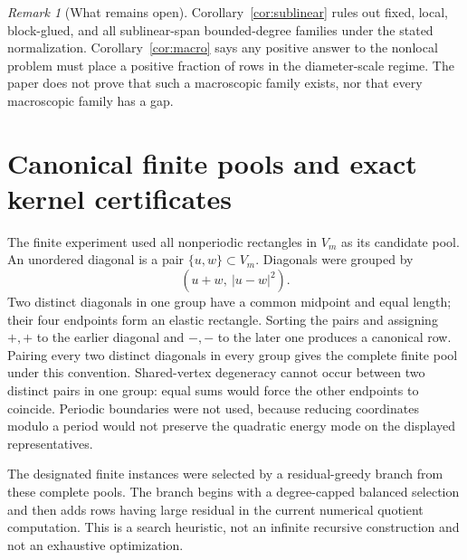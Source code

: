 \documentclass[11pt]{article}
\theoremstyle{definition}
\theoremstyle{remark}
\newtheorem{remark}[theorem]{Remark}
\begin{document}
\begin{remark}[What remains open]\label{rem:nonlocal}
Corollary~\ref{cor:sublinear} rules out fixed, local, block-glued, and all
sublinear-span bounded-degree families under the stated normalization.
Corollary~\ref{cor:macro} says any positive answer to the nonlocal problem
must place a positive fraction of rows in the diameter-scale regime.  The
paper does not prove that such a macroscopic family exists, nor that every
macroscopic family has a gap.
\end{remark}

\section{Canonical finite pools and exact kernel certificates}
\label{sec:certificates}

The finite experiment used all nonperiodic rectangles in $V_m$ as its
candidate pool.  An unordered diagonal is a pair $\{u,w\}\subset V_m$.
Diagonals were grouped by
\[
 (u+w,\ |u-w|^2).
\]
Two distinct diagonals in one group have a common midpoint and equal length;
their four endpoints form an elastic rectangle.  Sorting the pairs and
assigning $+,+$ to the earlier diagonal and $-,-$ to the later one produces a
canonical row.  Pairing every two distinct diagonals in every group gives the
complete finite pool under this convention.  Shared-vertex degeneracy cannot
occur between two distinct pairs in one group: equal sums would force the
other endpoints to coincide.  Periodic boundaries were not used, because
reducing coordinates modulo a period would not preserve the quadratic energy
mode on the displayed representatives.

The designated finite instances were selected by a residual-greedy branch
from these complete pools.  The branch begins with a degree-capped balanced
selection and then adds rows having large residual in the current numerical
quotient computation.  This is a search heuristic, not an infinite recursive
construction and not an exhaustive optimization.
\end{document}
